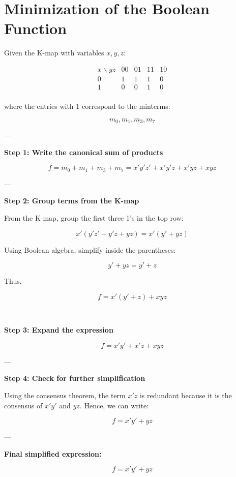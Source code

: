 \documentclass{article}
\begin{document}
\large  %

\section*{Minimization of the Boolean Function}

Given the K-map with variables \(x, y, z\):

\[
\begin{array}{c|cccc}
x \backslash yz & 00 & 01 & 11 & 10 \\ \hline
0 & 1 & 1 & 1 & 0 \\
1 & 0 & 0 & 1 & 0 \\
\end{array}
\]

where the entries with 1 correspond to the minterms:

\[
m_0, m_1, m_3, m_7
\]

---

\textbf{Step 1: Write the canonical sum of products}

\[
f = m_0 + m_1 + m_3 + m_7 = x'y'z' + x'y'z + x'yz + xyz
\]

---

\textbf{Step 2: Group terms from the K-map}

From the K-map, group the first three 1's in the top row:

\[
x'(y'z' + y'z + y z) = x' (y' + y z)
\]

Using Boolean algebra, simplify inside the parentheses:

\[
y' + y z = y' + z
\]

Thus,

\[
f = x'(y' + z) + x y z
\]

---

\textbf{Step 3: Expand the expression}

\[
f = x'y' + x'z + xyz
\]

---

\textbf{Step 4: Check for further simplification}

Using the consensus theorem, the term \(x'z\) is redundant because it is the consensus of \(x'y'\) and \(y z\). Hence, we can write:

\[
f = x'y' + y z
\]

---

\textbf{Final simplified expression:}

\[
\boxed{
f = x'y' + y z
}
\]
\end{document}
